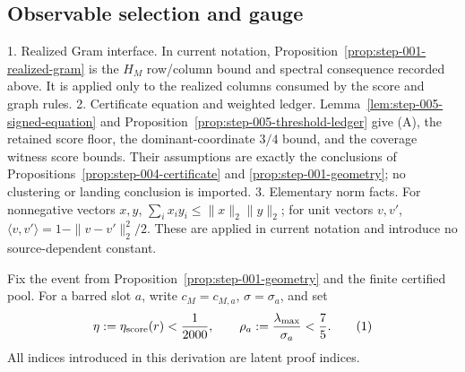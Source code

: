 \subsection{Observable selection and gauge}\label{app:step-006}

1. Realized Gram interface. In current notation,
   Proposition~\ref{prop:step-001-realized-gram} is the \(H_M\) row/column
   bound and spectral consequence recorded above. It is applied only to the
   realized columns consumed by the score and graph rules.
2. Certificate equation and weighted ledger.
   Lemma~\ref{lem:step-005-signed-equation} and
   Proposition~\ref{prop:step-005-threshold-ledger} give (A), the retained
   score floor, the dominant-coordinate \(3/4\) bound, and the coverage
   witness score bounds. Their assumptions are exactly the conclusions of Propositions~\ref{prop:step-004-certificate} and \ref{prop:step-001-geometry}; no
   clustering or landing conclusion is imported.
3. Elementary norm facts. For nonnegative vectors \(x,y\),
   \(\sum_i x_i y_i\le\|x\|_2\|y\|_2\); for unit vectors \(v,v'\),
   \(\langle v,v'\rangle=1-\|v-v'\|_2^2/2\). These are applied in current
   notation and introduce no source-dependent constant.

Fix the event from Proposition~\ref{prop:step-001-geometry} and the finite certified pool. For a barred slot
\(a\), write \(c_M=c_{M,a}\), \(\sigma=\sigma_a\), and set
\[
 \eta:=\eta_{\rm score}(r)<{1\over2000},\qquad
 \rho_a:={\lambda_{\max}\over\sigma_a}<{7\over5}. \tag{1}
\]
All indices introduced in this derivation are latent proof indices.


